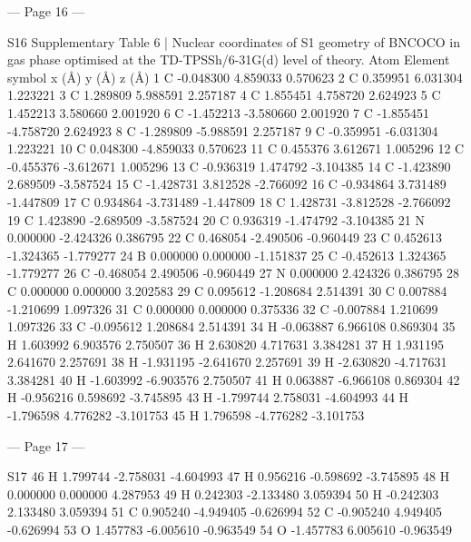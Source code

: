 --- Page 16 ---
 
S16 
Supplementary Table 6 | Nuclear coordinates of S1 geometry of BNCOCO in gas phase 
optimised at the TD-TPSSh/6-31G(d) level of theory. 
Atom 
Element symbol 
x (Å)        
y (Å)       
z (Å)        
1 
 C 
-0.048300  
4.859033  
0.570623  
2 
 C 
0.359951  
6.031304  
1.223221  
3 
 C 
1.289809  
5.988591  
2.257187  
4 
 C 
1.855451  
4.758720  
2.624923  
5 
 C 
1.452213  
3.580660  
2.001920  
6 
 C 
-1.452213  
-3.580660  
2.001920  
7 
 C 
-1.855451  
-4.758720  
2.624923  
8 
 C 
-1.289809  
-5.988591  
2.257187  
9 
 C 
-0.359951  
-6.031304  
1.223221  
10 
 C 
0.048300  
-4.859033  
0.570623  
11 
 C 
0.455376  
3.612671  
1.005296  
12 
 C 
-0.455376  
-3.612671  
1.005296  
13 
 C 
-0.936319  
1.474792  
-3.104385  
14 
 C 
-1.423890  
2.689509  
-3.587524  
15 
 C 
-1.428731  
3.812528  
-2.766092  
16 
 C 
-0.934864  
3.731489  
-1.447809  
17 
 C 
0.934864  
-3.731489  
-1.447809  
18 
 C 
1.428731  
-3.812528  
-2.766092  
19 
 C 
1.423890  
-2.689509  
-3.587524  
20 
 C 
0.936319  
-1.474792  
-3.104385  
21 
 N 
0.000000  
-2.424326  
0.386795  
22 
 C 
0.468054  
-2.490506  
-0.960449  
23 
 C 
0.452613  
-1.324365  
-1.779277  
24 
 B 
0.000000  
0.000000  
-1.151837  
25 
 C 
-0.452613  
1.324365  
-1.779277  
26 
 C 
-0.468054  
2.490506  
-0.960449  
27 
 N 
0.000000  
2.424326  
0.386795  
28 
 C 
0.000000  
0.000000  
3.202583  
29 
 C 
0.095612  
-1.208684  
2.514391  
30 
 C 
0.007884  
-1.210699  
1.097326  
31 
 C 
0.000000  
0.000000  
0.375336  
32 
 C 
-0.007884  
1.210699  
1.097326  
33 
 C 
-0.095612  
1.208684  
2.514391  
34 
 H 
-0.063887  
6.966108  
0.869304  
35 
 H 
1.603992  
6.903576  
2.750507  
36 
 H 
2.630820  
4.717631  
3.384281  
37 
 H 
1.931195  
2.641670  
2.257691  
38 
 H 
-1.931195  
-2.641670  
2.257691  
39 
 H 
-2.630820  
-4.717631  
3.384281  
40 
 H 
-1.603992  
-6.903576  
2.750507  
41 
 H 
0.063887  
-6.966108  
0.869304  
42 
 H 
-0.956216  
0.598692  
-3.745895  
43 
 H 
-1.799744  
2.758031  
-4.604993  
44 
 H 
-1.796598  
4.776282  
-3.101753  
45 
 H 
1.796598  
-4.776282  
-3.101753  


--- Page 17 ---
 
S17 
46 
 H 
1.799744  
-2.758031  
-4.604993  
47 
 H 
0.956216  
-0.598692  
-3.745895  
48 
 H 
0.000000  
0.000000  
4.287953  
49 
 H 
0.242303  
-2.133480  
3.059394  
50 
 H 
-0.242303  
2.133480  
3.059394  
51 
 C 
0.905240  
-4.949405  
-0.626994  
52 
 C 
-0.905240  
4.949405  
-0.626994  
53 
 O 
1.457783  
-6.005610  
-0.963549  
54 
 O 
-1.457783  
6.005610  
-0.963549  
 
